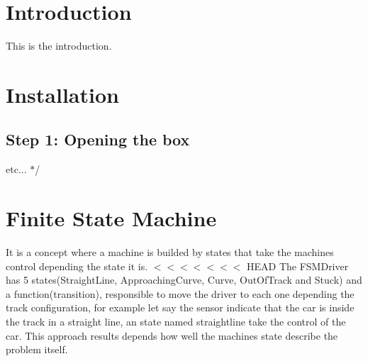 
\begin{DoxyItemize}
\item 
\item 
\end{DoxyItemize}\hypertarget{index_intro_sec}{}\section{Introduction}\label{index_intro_sec}

\begin{DoxyItemize}
\item 
\item This is the introduction.
\item 
\item 
\end{DoxyItemize}\hypertarget{index_install_sec}{}\section{Installation}\label{index_install_sec}

\begin{DoxyItemize}
\item 
\item 
\end{DoxyItemize}\hypertarget{index_step1}{}\subsection{Step 1\+: Opening the box}\label{index_step1}

\begin{DoxyItemize}
\item 
\item etc... $\ast$/
\end{DoxyItemize}

\section*{Finite State Machine }

It is a concept where a machine is builded by states that take the machine\textquotesingle{}s control depending the state it is. $<$$<$$<$$<$$<$$<$$<$ H\+E\+A\+D The F\+S\+M\+Driver has 5 states(\+Straight\+Line, Approaching\+Curve, Curve, Out\+Of\+Track and Stuck) and a function(transition), responsible to move the driver to each one depending the track configuration, for example let say the sensor indicate that the car is inside the track in a straight line, an state named straightline take the control of the car. This approach results depends how well the machine\textquotesingle{}s state describe the problem itself.

